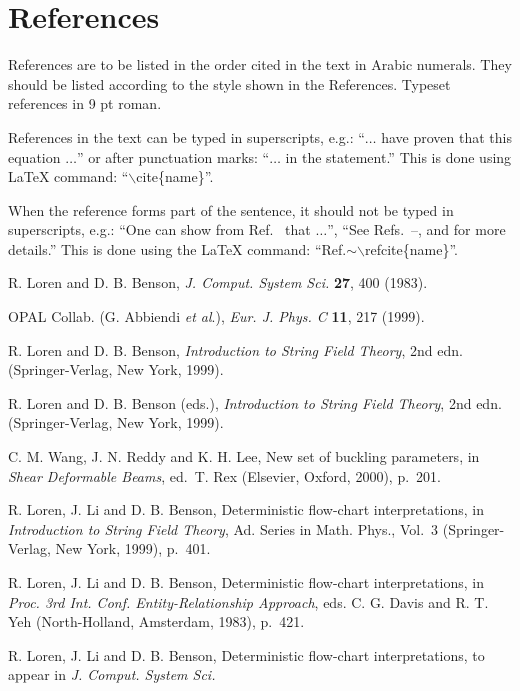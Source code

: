 \documentclass{ws-ijmpcs}
\begin{document}
\section{References}

References are to be listed in the order cited in the text in Arabic
numerals.  They should be listed according to the style shown in the
References. Typeset references in 9 pt roman.

References in the text can be typed in superscripts,
e.g.: ``$\ldots$ have proven\cite{autbk}\cdash\cite{rvo} that
this equation $\ldots$'' or after punctuation marks:
``$\ldots$ in the statement.\cite{rvo}'' This is
done using LaTeX command: ``$\backslash$cite\{name\}''.

When the reference forms part of the sentence, it should not
be typed in superscripts, e.g.: ``One can show from
Ref.~ that $\ldots$'', ``See
Refs.~--, 
and  for more details.''
This is done using the LaTeX
command: ``Ref.$\sim\backslash$refcite\{name\}''.

\begin{thebibliography}{0}    %

 R. Loren and D. B. Benson, {\it J. Comput.
System Sci.} {\bf 27}, 400 (1983).

 OPAL Collab. (G. Abbiendi {\it et al}.),
{\it Eur. J. Phys. C\/} {\bf 11}, 217 (1999).

 R. Loren and D. B. Benson, {\it Introduction to String
Field Theory}, 2nd edn. (Springer-Verlag, New York, 1999).

 R. Loren and D. B. Benson (eds.), {\it Introduction to
String Field Theory}, 2nd edn. (Springer-Verlag, New York, 1999).

 C. M. Wang, J. N. Reddy and K. H. Lee, New set of
buckling parameters, in {\it Shear Deformable Beams}, ed.~T. Rex
(Elsevier, Oxford, 2000), p.~201.

 R. Loren, J. Li and D. B. Benson, Deterministic flow-chart
interpretations, in {\it Introduction to String Field Theory},
Ad. Series in Math. Phys., Vol.~3 (Springer-Verlag, New York, 1999),
p.~401.

 R. Loren, J. Li and D. B. Benson, Deterministic
flow-chart interpretations, in {\it Proc. 3rd Int. Conf.
Entity-Relationship Approach}, eds. C. G. Davis and R. T. Yeh
(North-Holland, Amsterdam, 1983), p.~421.

 R. Loren, J. Li and D. B. Benson, Deterministic
flow-chart interpretations, to appear in {\it J. Comput. System Sci.}
\end{thebibliography}
\end{document}
